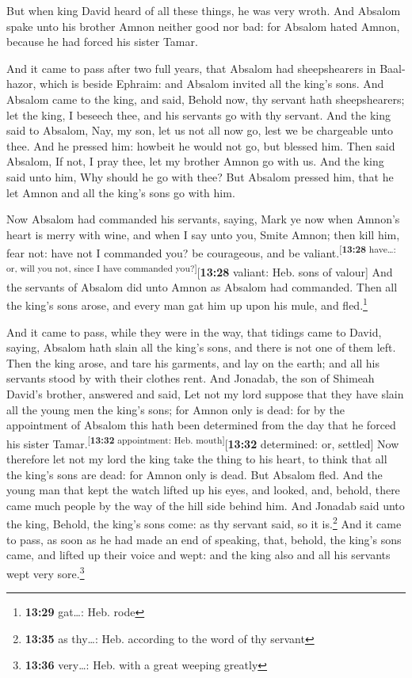 But when king David heard of all these things, he was
very wroth.  And Absalom spake unto his brother Amnon
neither good nor bad: for Absalom hated Amnon, because he had forced his
sister Tamar.

 And it came to pass after two full years, that Absalom
had sheepshearers in Baal-hazor, which is beside Ephraim: and Absalom
invited all the king's sons.  And Absalom came to the
king, and said, Behold now, thy servant hath sheepshearers; let the
king, I beseech thee, and his servants go with thy servant.
 And the king said to Absalom, Nay, my son, let us not
all now go, lest we be chargeable unto thee. And he pressed him: howbeit
he would not go, but blessed him.  Then said Absalom, If
not, I pray thee, let my brother Amnon go with us. And the king said
unto him, Why should he go with thee?  But Absalom
pressed him, that he let Amnon and all the king's sons go with him.

 Now Absalom had commanded his servants, saying, Mark ye
now when Amnon's heart is merry with wine, and when I say unto you,
Smite Amnon; then kill him, fear not: have not I commanded you? be
courageous, and be valiant.\textsuperscript{{[}\textbf{13:28}
have\ldots: or, will you not, since I have commanded
you?{]}}{[}\textbf{13:28} valiant: Heb. sons of valour{]}
 And the servants of Absalom did unto Amnon as Absalom
had commanded. Then all the king's sons arose, and every man gat him up
upon his mule, and fled.\footnote{\textbf{13:29} gat\ldots: Heb. rode}

 And it came to pass, while they were in the way, that
tidings came to David, saying, Absalom hath slain all the king's sons,
and there is not one of them left.  Then the king arose,
and tare his garments, and lay on the earth; and all his servants stood
by with their clothes rent.  And Jonadab, the son of
Shimeah David's brother, answered and said, Let not my lord suppose that
they have slain all the young men the king's sons; for Amnon only is
dead: for by the appointment of Absalom this hath been determined from
the day that he forced his sister
Tamar.\textsuperscript{{[}\textbf{13:32} appointment: Heb.
mouth{]}}{[}\textbf{13:32} determined: or, settled{]} 
Now therefore let not my lord the king take the thing to his heart, to
think that all the king's sons are dead: for Amnon only is dead.
 But Absalom fled. And the young man that kept the watch
lifted up his eyes, and looked, and, behold, there came much people by
the way of the hill side behind him.  And Jonadab said
unto the king, Behold, the king's sons come: as thy servant said, so it
is.\footnote{\textbf{13:35} as thy\ldots: Heb. according to the word of
  thy servant}  And it came to pass, as soon as he had
made an end of speaking, that, behold, the king's sons came, and lifted
up their voice and wept: and the king also and all his servants wept
very sore.\footnote{\textbf{13:36} very\ldots: Heb. with a great weeping
  greatly}

